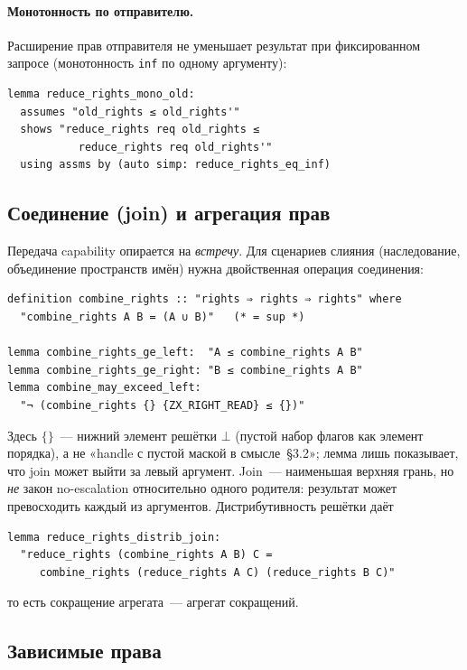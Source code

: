 \documentclass[11pt,a4paper]{article}
\begin{document}
\paragraph{Монотонность по отправителю.}
Расширение прав отправителя не уменьшает результат при фиксированном
запросе (монотонность \texttt{inf} по одному аргументу):
\begin{lstlisting}
lemma reduce_rights_mono_old:
  assumes "old_rights ≤ old_rights'"
  shows "reduce_rights req old_rights ≤
           reduce_rights req old_rights'"
  using assms by (auto simp: reduce_rights_eq_inf)
\end{lstlisting}

\subsection{Соединение (join) и агрегация прав}

Передача \textenglish{capability} опирается на \emph{встречу}. Для сценариев слияния
(наследование, объединение пространств имён) нужна двойственная операция
соединения:
\begin{lstlisting}
definition combine_rights :: "rights ⇒ rights ⇒ rights" where
  "combine_rights A B = (A ∪ B)"   (* = sup *)

lemma combine_rights_ge_left:  "A ≤ combine_rights A B"
lemma combine_rights_ge_right: "B ≤ combine_rights A B"
lemma combine_may_exceed_left:
  "¬ (combine_rights {} {ZX_RIGHT_READ} ≤ {})"
\end{lstlisting}
Здесь $\{\}$~--- нижний элемент решётки $\bot$ (пустой набор флагов как
элемент порядка), а не «handle с пустой маской в смысле~§3.2»; лемма
лишь показывает, что join может выйти за левый аргумент. Join~---
наименьшая верхняя грань, но \emph{не} закон no-escalation
относительно одного родителя: результат может превосходить каждый из
аргументов. Дистрибутивность решётки даёт
\begin{lstlisting}
lemma reduce_rights_distrib_join:
  "reduce_rights (combine_rights A B) C =
     combine_rights (reduce_rights A C) (reduce_rights B C)"
\end{lstlisting}
то есть сокращение агрегата~--- агрегат сокращений.

\subsection{Зависимые права}
\end{document}
